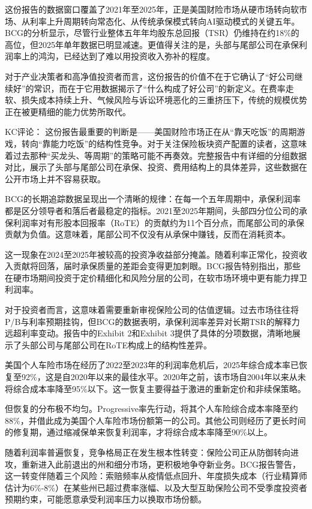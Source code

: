 \documentclass[11pt]{ctexart}
\begin{document}
这份报告的数据窗口覆盖了2021年至2025年，正是美国财险市场从硬市场转向软市场、从利率上升周期转向常态化、从传统承保模式转向AI驱动模式的关键五年。BCG的分析显示，尽管行业整体五年年均股东总回报（TSR）仍维持在约18\%的高位，但2025年单年数据已明显减速。更值得关注的是，头部与尾部公司在承保利润率上的鸿沟，已经达到了难以用投资收入弥补的程度。

对于产业决策者和高净值投资者而言，这份报告的价值不在于它确认了“好公司继续好”的常识，而在于它用数据揭示了“什么构成了好公司”的新定义。在费率走软、损失成本持续上升、气候风险与诉讼环境恶化的三重挤压下，传统的规模优势正在被更精细的能力优势所取代。

KC评论： 这份报告最重要的判断是——美国财险市场正在从“靠天吃饭”的周期游戏，转向“靠能力吃饭”的结构性竞争。对于关注保险板块资产配置的读者，这意味着过去那种“买龙头、等周期”的策略可能不再奏效。完整报告中有详细的分组数据对比，展示了头部与尾部公司在承保、投资、费用结构上的具体差异，这些数据在公开市场上并不容易获取。

BCG的长期追踪数据呈现出一个清晰的规律：在每一个五年周期中，承保利润率都是区分领导者和落后者最稳定的指标。2021至2025年期间，头部四分位公司的承保利润率对有形股本回报率（RoTE）的贡献约为11个百分点，而尾部公司的承保贡献为负值。这意味着，尾部公司不仅没有从承保中赚钱，反而在消耗资本。

这一现象在2024至2025年被较高的投资净收益部分掩盖。随着利率正常化，投资收入贡献将回落，届时承保质量的差距会变得更加刺眼。BCG报告特别指出，那些在硬市场期间投资于定价精细化和风险分层的公司，在软市场环境中更有能力捍卫利润率。

对于投资者而言，这意味着需要重新审视保险公司的估值逻辑。过去市场往往将P/B与利率预期挂钩，但BCG的数据表明，承保利润率差异对长期TSR的解释力远超利率变动。报告中的Exhibit 2和Exhibit 3提供了具体的分项数据，清晰地展示了头部公司与尾部公司在RoTE构成上的结构性差异。

美国个人车险市场在经历了2022至2023年的利润率危机后，2025年综合成本率已恢复至92\%，这是自2020年以来的最佳水平。2020年之前，该市场自2004年以来从未将综合成本率降至95\%以下。这一恢复主要得益于激进的重新定价和非续保策略。

但恢复的分布极不均匀。Progressive率先行动，将其个人车险综合成本率降至约88\%，并借此成为美国个人车险市场份额第一的公司。其他公司则经历了更长时间的修复期，通过缩减保单来恢复利润率，才将综合成本率降至90\%以上。

随着利润率普遍恢复，竞争格局正在发生根本性转变：保险公司正从防御转向进攻，重新进入此前退出的州和细分市场，更积极地争夺新业务。BCG报告警告，这一转变伴随着三个风险：索赔频率从疫情低点回升、年度损失成本（行业精算师估计为6\%-8\%）在某些州已超过费率涨幅、以及大型互助保险公司不受季度投资者预期约束，可能愿意承受利润率压力以换取市场份额。
\end{document}
